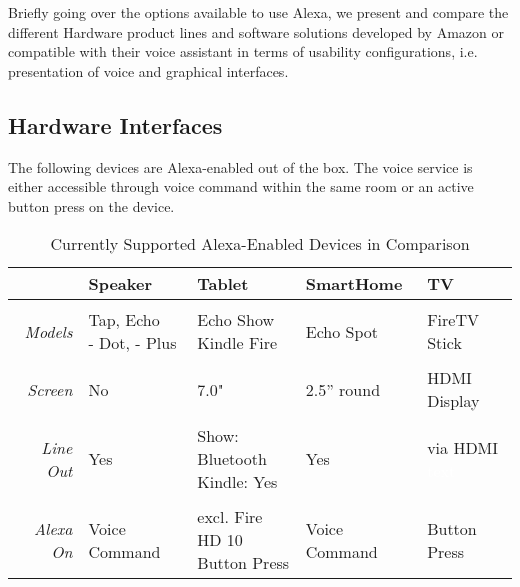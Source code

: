 Briefly going over the options available to use Alexa, we present and compare the different Hardware product lines and software solutions developed by Amazon or compatible with their voice assistant in terms of usability configurations, i.e. presentation of voice and graphical interfaces.

\subsection*{Hardware Interfaces}

The following devices are Alexa-enabled out of the box. The voice service is either accessible through voice command within the same room or an active button press on the device.

\begin{table}[htbp!]
	\caption[Alexa Devices in Comparision]{Currently Supported Alexa-Enabled Devices in Comparison}\label{alexaDeviceTable}
	\begin{tabularx}{\textwidth}{  r | l l l l  }
		
				& Speaker							& Tablet	& SmartHome	& TV	\\ \hline \hline \\
		\textit{Models}	& \shortstack[l]{Tap, Echo \\ - Dot, - Plus}     & \shortstack[l]{Echo Show \\ Kindle Fire}    & Echo Spot & FireTV Stick \\ \hline \\
		\textit{Screen}  		& No      & 7.0" 		& 2.5'' round				&  HDMI Display      \\ \hline \\
		\textit{Line Out}		& Yes      					        & \shortstack[l]{Show: Bluetooth \\ Kindle: Yes} & 	Yes & \shortstack{via HDMI \\ \textcolor{white}{text} }      \\ \hline \\
		\textit{Alexa On} 	& Voice	Command					&
		\shortstack[l]{excl. Fire HD 10\\Button Press}
		& Voice Command & %
		Button Press
	\end{tabularx}
\end{table}




